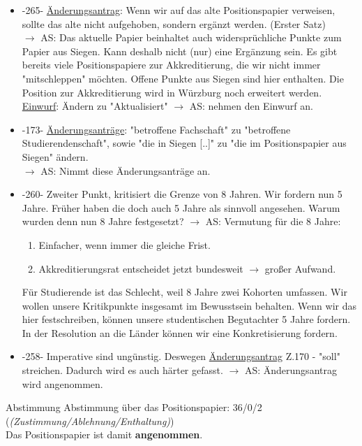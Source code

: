 \begin{itemize}
      \item -265- \underline{Änderungsantrag}: Wenn wir auf das alte Positionspapier verweisen, sollte das alte nicht aufgehoben, sondern ergänzt werden. (Erster Satz) \\
        $\rightarrow$ AS: Das aktuelle Papier beinhaltet auch widersprüchliche Punkte zum Papier aus Siegen. Kann deshalb nicht (nur) eine Ergänzung sein. Es gibt bereits viele Positionspapiere zur Akkreditierung, die wir nicht immer "mitschleppen" möchten. Offene Punkte aus Siegen sind hier enthalten. Die Position zur Akkreditierung wird in Würzburg noch erweitert werden. \\
        \underline{Einwurf}: Ändern zu "Aktualisiert"
          $\rightarrow$ AS: nehmen den Einwurf an.
      \item -173- \underline{Änderungsanträge}: "betroffene Fachschaft" zu "betroffene Studierendenschaft", sowie "die in Siegen [..]" zu "die im Positionspapier aus Siegen" ändern. \\
        $\rightarrow$ AS: Nimmt diese Änderungsanträge an.
      \item -260- Zweiter Punkt, kritisiert die Grenze von 8 Jahren. Wir fordern nun 5 Jahre. Früher haben die doch auch 5 Jahre als sinnvoll angesehen. Warum wurden denn nun 8 Jahre festgesetzt?
        $\rightarrow$ AS: Vermutung für die 8 Jahre:
        \begin{enumerate}
          \item Einfacher, wenn immer die gleiche Frist.
          \item Akkreditierungsrat entscheidet jetzt bundesweit $\rightarrow$ großer Aufwand.
        \end{enumerate}
        Für Studierende ist das Schlecht, weil 8 Jahre zwei Kohorten umfassen.
        Wir wollen unsere Kritikpunkte insgesamt im Bewusstsein behalten.
        Wenn wir das hier festschreiben, können unsere studentischen Begutachter 5 Jahre fordern.
        In der Resolution an die Länder können wir eine Konkretisierung fordern.
      \item -258- Imperative sind ungünstig. Deswegen \underline{Änderungsantrag} Z.170 - "soll" streichen. Dadurch wird es auch härter gefasst.
        $\rightarrow$ AS: Änderungsantrag wird angenommen.
    \end{itemize}

    \begin{success}{Abstimmung}
      Abstimmung über das Positionspapier: 36/0/2 (\textit{(Zustimmung/Ablehnung/Enthaltung)}) \\
      Das Positionspapier ist damit \textbf{angenommen}.
    \end{success}

